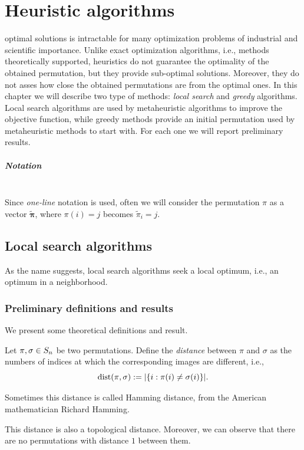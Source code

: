 
\chapter{Heuristic algorithms}
\label{chap:Heuristic}

 optimal solutions is intractable for many optimization problems of industrial and scientific importance. Unlike exact optimization algorithms, i.e., methods theoretically supported, heuristics do not guarantee the optimality of the obtained permutation, but they provide sub-optimal solutions. Moreover, they do not asses how close the obtained permutations are  from the optimal ones. In this chapter we will describe two type of methods: \textit{local search}  and \textit{greedy} algorithms. Local search algorithms are used by metaheuristic algorithms to improve the objective function, while greedy methods provide an initial permutation used by metaheuristic methods to start with. For each one we will report preliminary results. 

\paragraph{Notation} \mbox{}\\
 Since \textit{one-line} notation is used, often we will consider the permutation $\pi$ as a vector $\tilde{\bm \pi}$, where $\pi(i)=j$ becomes $\tilde{\pi}_i=j$. 



\section{Local search algorithms}
\label{sec:LocalSearch}
As the name suggests, local search algorithms seek a local optimum, i.e., an optimum in a neighborhood. 

\subsection{Preliminary definitions and results }


\noindent We present some theoretical definitions and result.

\begin{defi}
	Let $\pi,\sigma \in S_n$ be two permutations. Define the \textit{distance} between $\pi$ and $\sigma$ as the  numbers of indices at which the corresponding images are different, i.e.,
	\[
	\dist(\pi,\sigma):=\abs*{\{i: \pi(i)\neq \sigma(i)\}}.
	\]
\end{defi}
\noindent Sometimes this distance is called Hamming distance, from the American mathematician Richard Hamming.
\begin{oss}
	\label{rem:Distanza}
	This distance is also a topological distance. Moreover, we can observe that there are no permutations with distance $1$ between them.
\end{oss}

